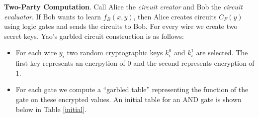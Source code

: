 \documentclass[11pt]{article}
\begin{document}
\noindent \textbf{Two-Party Computation}. Call Alice the \emph{circuit creator} and Bob the \emph{circuit evaluator}. If Bob wants to learn $f_B(x,y)$, then Alice creates circuits $C_F(y)$ using logic gates and sends the circuits to Bob. For every wire we create two secret keys. Yao's garbled circuit construction \cite{Yao1982} is as follows:
\begin{itemize}
\item For each wire $y_i$ two random cryptographic keys ${k^0_i}$ and ${k^1_i}$ are selected. The first key represents an encrpytion of $0$ and the second represents encryption of $1$.
\item For each gate we compute a ``garbled table'' representing the function of the gate on these encrypted values. An initial table for an AND gate is shown below in Table \ref{initial}.
\end{itemize}
\end{document}
